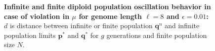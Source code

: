 \begin{figure}[H]
\begin{center}
\hspace{5pt}
\hspace{5pt}


\caption{\textbf{Infinite and finite diploid population oscillation behavior in case of violation in $\mu$ for genome length $\ell = 8$ and $\epsilon = 0.01$:} $d$ is
  distance between infinite or finite population ${\bm q}^n$ and infinite
  population limits ${{\bm p}^\ast}$ and ${{\bm q}^{\ast}}$ for $g$ generations and finite population size $N$.}
\label{oscillation_8d_vio_mu_0.01}
\end{center}
\end{figure}



